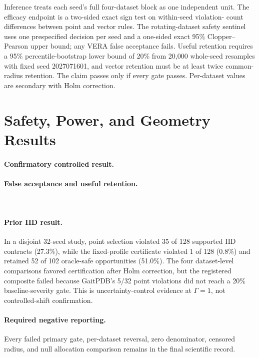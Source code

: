 Inference treats each seed's full four-dataset block as one independent unit.
The efficacy endpoint is a two-sided exact sign test on within-seed violation-
count differences between point and vector rules. The rotating-dataset safety
sentinel uses one prespecified decision per seed and a one-sided exact 95\%
Clopper--Pearson upper bound; any VERA false acceptance fails. Useful retention
requires a 95\% percentile-bootstrap lower bound of 20\% from 20,000 whole-seed
resamples with fixed seed 2027071601, and vector retention must be at least twice
common-radius retention. The claim passes only if every gate passes.
Per-dataset values are secondary with Holm correction.

\section{Safety, Power, and Geometry Results}
\label{neurips:sec:results}

\paragraph{Confirmatory controlled result.}
\ControlledPrimaryResult

\paragraph{False acceptance and useful retention.}
\ControlledSafetyResult\ \ControlledRetentionResult

\ControlledMainResultTable
\ControlledMainResultFigure

\paragraph{Prior IID result.}
In a disjoint 32-seed study, point selection violated 35 of 128 supported IID
contracts (27.3\%), while the fixed-profile certificate violated 1 of 128
(0.8\%) and retained 52 of 102 oracle-safe opportunities (51.0\%). The four
dataset-level comparisons favored certification after Holm correction, but the
registered composite failed because GaitPDB's 5/32 point violations did not
reach a 20\% baseline-severity gate. This is uncertainty-control evidence at
$\Gamma=1$, not controlled-shift confirmation.

\paragraph{Required negative reporting.}
\ControlledNegativeResults{} Every failed primary gate, per-dataset reversal,
zero denominator, censored radius, and null allocation comparison remains in
the final scientific record.

